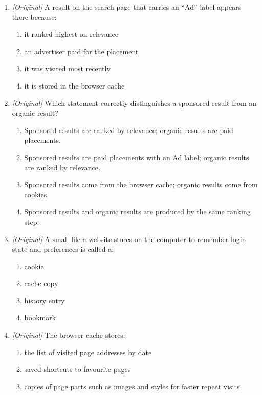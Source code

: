 \documentclass[11pt]{article}
\begin{document}
\begin{enumerate}[label=\textbf{Q\arabic*.}, leftmargin=*]
\begin{enumerate}[label=\Alph*.]
    \item drivers
    \item firewalls
  \end{enumerate}
\item \textit{[Original]} A result on the search page that carries an ``Ad''
  label appears there because:
  \begin{enumerate}[label=\Alph*.]
    \item it ranked highest on relevance
    \item an advertiser paid for the placement
    \item it was visited most recently
    \item it is stored in the browser cache
  \end{enumerate}
\item \textit{[Original]} Which statement correctly distinguishes a sponsored
  result from an organic result?
  \begin{enumerate}[label=\Alph*.]
    \item Sponsored results are ranked by relevance; organic results are paid placements.
    \item Sponsored results are paid placements with an Ad label; organic results are ranked by relevance.
    \item Sponsored results come from the browser cache; organic results come from cookies.
    \item Sponsored results and organic results are produced by the same ranking step.
  \end{enumerate}
\item \textit{[Original]} A small file a website stores on the computer to
  remember login state and preferences is called a:
  \begin{enumerate}[label=\Alph*.]
    \item cookie
    \item cache copy
    \item history entry
    \item bookmark
  \end{enumerate}
\item \textit{[Original]} The browser cache stores:
  \begin{enumerate}[label=\Alph*.]
    \item the list of visited page addresses by date
    \item saved shortcuts to favourite pages
    \item copies of page parts such as images and styles for faster repeat visits

\end{enumerate}
\end{enumerate}
\end{document}
